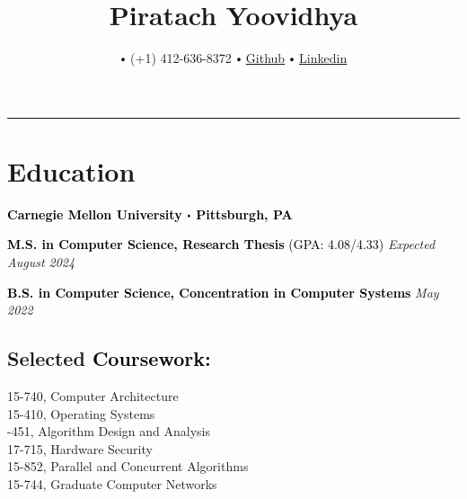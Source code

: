 \documentclass[10pt]{article}
\title{\bfseries\Huge Piratach Yoovidhya}
\author{
  \small \myemail
   $\sbullet[.75]$
   (+1) 412-636-8372
   $\sbullet[.75]$
   \href{https://github.com/Piratach}{\underline{Github}}
   $\sbullet[.75]$
  \href{https://www.linkedin.com/in/piratach-yoovidhya/}
  {\underline{Linkedin}}
}
\date{}
\newcommand\sbullet[1][.5]{\mathbin{\vcenter{\hbox{\scalebox{#1}{$\bullet$}}}}}
\begin{document}
  \maketitle
  \thispagestyle{empty}
  \vspace*{-1.0cm}
  \hrule
  \vspace*{-0.15cm}

  \section*{\Large \textcolor{lighterB}{Education}}
  \vspace*{-0.3cm}

  \textbf{\large \textcolor{Black}{Carnegie Mellon University $\sbullet$ Pittsburgh, PA}}

  \vspace{0.05cm}

\textcolor{Black}{\textbf{M.S. in Computer Science, Research Thesis} (GPA: 4.08/4.33)} \hfill \textit{Expected August 2024}

  \vspace{0.05cm}

\textcolor{Black}{\textbf{B.S. in Computer Science, Concentration in Computer Systems}} \hfill \textit{May 2022}

  \vspace{0.2cm}

  \vspace*{-0.5cm}

  \subsection*{Selected \textcolor{Black}{Coursework:}}

    \vspace*{-0.55cm}
    \begin{multicols}{2}
       15-740, Computer Architecture \\
       15-410, Operating Systems \\
       -451, Algorithm Design and Analysis \\
       17-715, Hardware Security \\
       15-852, Parallel and Concurrent Algorithms \\
       15-744, Graduate Computer Networks \\
    \end{multicols}
\end{document}
